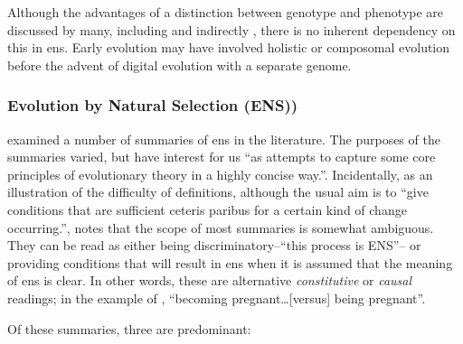 Although the advantages of a distinction between genotype and phenotype are discussed by many, including \parencite[section 7.2.3]{Taylor1999} and indirectly \cite{VonNeumann1966}, there is no inherent dependency on this in \gls{ens}. Early evolution may have involved holistic or composomal evolution before the advent of digital evolution with a separate genome.



\subsubsection{Evolution by Natural Selection (ENS))}\label{ens-evolution-by-natural-selection}

\cite{Godfrey-Smith2007} examined a number of summaries of \gls{ens} in the literature. The purposes of the summaries varied, but have interest for us ``as attempts to capture some core principles of evolutionary theory in a highly concise way.''. Incidentally, as an illustration of the difficulty of definitions, although the usual aim is to ``give conditions that are sufficient ceteris paribus for a certain kind of change occurring.'', \cite{Godfrey-Smith2007} notes that the scope of most summaries is somewhat ambiguous. They can be read as either being discriminatory--``this process is ENS''-- or providing conditions that will result in \gls{ens} when it is assumed that the meaning of \gls{ens} is clear. In other words, these are alternative \emph{constitutive} or \emph{causal} readings; in the example of \cite{Godfrey-Smith2007}, ``becoming pregnant\ldots{}{[}versus{]} being pregnant''.

Of these summaries, three are predominant:

